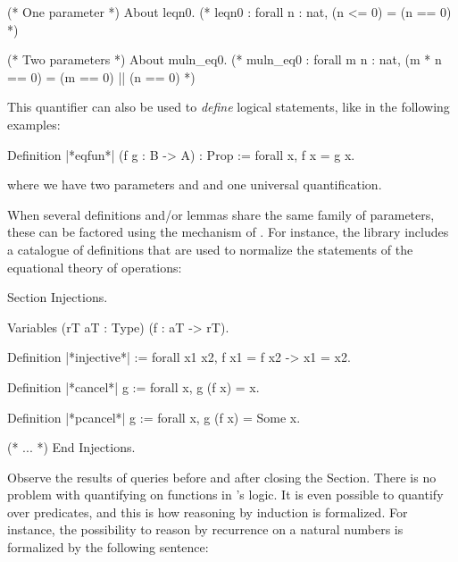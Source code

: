 \begin{coq}{}{}
(* One parameter *)
About leqn0.
  (* leqn0 : forall n : nat, (n <= 0) = (n == 0) *)

(* Two parameters *)
About muln_eq0.
  (* muln_eq0 : forall m n : nat, (m * n == 0) = (m == 0) || (n == 0) *)

\end{coq}

This quantifier can also be used to \emph{define} logical statements,
like in the following examples:

\begin{coq}{}{}
Definition |*eqfun*| (f g : B -> A) : Prop := forall x, f x = g x.
\end{coq}

where we have two parameters  and  and one universal
quantification.


When several definitions and/or lemmas share the same family of
parameters, these can be factored using the  mechanism of
. For instance, the  library includes a catalogue of
definitions that are used to normalize the statements of the
equational theory of operations:

\begin{coq}{}{}

Section Injections.

Variables (rT aT : Type) (f : aT -> rT).

Definition |*injective*| := forall x1 x2, f x1 = f x2 -> x1 = x2.

Definition |*cancel*| g := forall x, g (f x) = x.

Definition |*pcancel*| g := forall x, g (f x) = Some x.

(* ... *)
End Injections.
\end{coq}

Observe the results of  queries before and after closing the
Section. There is no problem with quantifying on functions in
's logic. It is even possible to quantify over predicates, and
this is how reasoning by induction is formalized. For instance, the
possibility to reason by recurrence on a natural numbers is formalized
by the following sentence:


